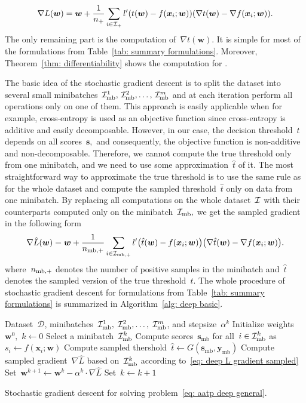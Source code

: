 \begin{equation}\label{eq: deep L gradient true}
  \nabla L(\bm{w})
    = \bm{w} + \frac{1}{\npos} \sum_{i \in \Ipos} l'\Brac{t(\bm{w}) - f(\bm{x}_i; \bm{w})}\Brac{\nabla t(\bm{w}) - \nabla f(\bm{x}_i; \bm{w})}.
\end{equation}
The only remaining part is the computation of~$\nabla t(\bm{w})$. It is simple for most of the formulations from Table~\ref{tab: summary formulations}. Moreover, Theorem~\ref{thm: differentiability} shows the computation for \PatMat.

The basic idea of the stochastic gradient descent is to split the dataset into several small minibatches~$\mathcal{I}_{\text{mb}}^1, \, \mathcal{I}_{\text{mb}}^2, \ldots, \, \mathcal{I}_{\text{mb}}^m$ and at each iteration perform all operations only on one of them. This approach is easily applicable when for example, cross-entropy is used as an objective function since cross-entropy is additive and easily decomposable. However, in our case, the decision threshold~$t$ depends on all scores~$\bm{s},$ and consequently, the objective function is non-additive and non-decomposable. Therefore, we cannot compute the true threshold only from one minibatch, and we need to use some approximation~$\hat{t}$ of it. The most straightforward way to approximate the true threshold is to use the same rule as for the whole dataset and compute the sampled threshold~$\hat{t}$ only on data from one minibatch. By replacing all computations on the whole dataset~$\mathcal{I}$ with their counterparts computed only on the minibatch~$\mathcal{I}_{\text{mb}},$ we get the sampled gradient in the following form
\begin{equation}\label{eq: deep L gradient sampled}
  \nabla \hat{L}(\bm{w})
    = \bm{w} + \frac{1}{\nmbpos} \sum_{i \in \Imbpos} l'\Brac{\hat{t}(\bm{w}) - f(\bm{x}_i; \bm{w})}\Brac{\nabla \hat{t}(\bm{w}) - \nabla f(\bm{x}_i; \bm{w})}.
\end{equation}
where~$n_{\text{mb},+}$ denotes the number of positive samples in the minibatch and~$\hat{t}$ denotes the sampled version of the true threshold~$t.$ The whole procedure of stochastic gradient descent for formulations from Table~\ref{tab: summary formulations} is summarized in Algorithm~\ref{alg: deep basic}.

\begin{algorithm}
  \centering
  \begin{algorithmic}[1]
    \Require Dataset~$\mathcal{D}$, minibatches~$\mathcal{I}_{\text{mb}}^1,\; \mathcal{I}_{\text{mb}}^2, \ldots, \; \mathcal{I}_{\text{mb}}^m$, and stepsize~$\alpha^k$
    \State Initialize weights~$\bm{w}^0,$ $k \gets 0$
    \Repeat
    \State Select a minibatch~$\mathcal{I}_{\text{mb}}^k$
    \State Compute scores~$\bm{s}_{\text{mb}}$ for all~$i \in \mathcal{I}_{\text{mb}}^k$ as~$s_i \gets f(\bm{x}_i; \bm{w})$ 
    \State Compute sampled thershold~$\hat{t} \gets G(\bm{s}_{\text{mb}}, \bm{y}_{\text{mb}})$
    \State Compute sampled gradient~$\nabla \hat{L}$ based on~$\mathcal{I}_{\text{mb}}^k$ according to~\eqref{eq: deep L gradient sampled}
    \State Set~$\bm{w}^{k+1} \gets \bm{w}^k - \alpha^k \cdot \nabla \hat{L}$
    \State Set~$k \gets k + 1$
  \end{algorithmic}
  \caption{Stochastic gradient descent for solving problem~\eqref{eq: aatp deep general}.}
  \label{alg: deep basic}
\end{algorithm}

